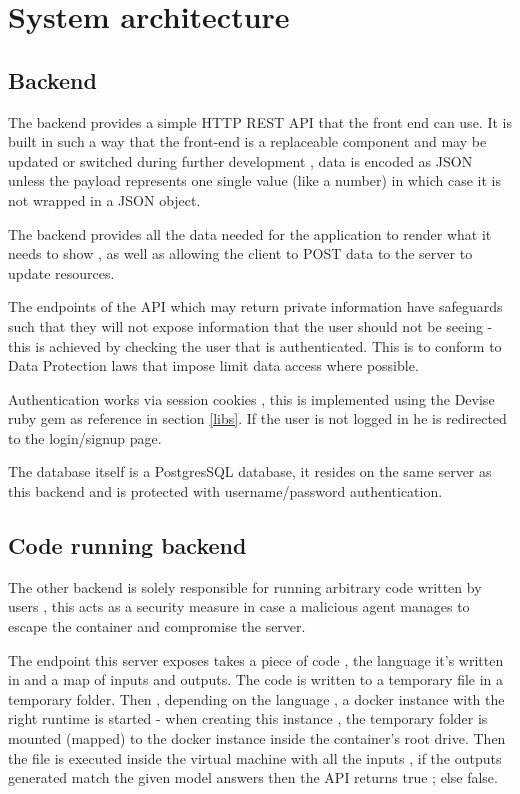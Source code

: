 \section{System architecture}
\subsection{Backend}
The backend provides a simple HTTP REST API that the front end can use. It is built in such a way that the front-end is a replaceable component and may be updated or switched during further development , data is encoded as JSON unless the payload represents one single value (like a number) in which case it is not wrapped in a JSON object.

The backend provides all the data needed for the application to render what it needs to show , as well as allowing the client to POST data to the server to update resources.

The endpoints of the API which may return private information have safeguards such that they will not expose information that the user should not be seeing - this is achieved by checking the user that is authenticated. This is to conform to Data Protection laws that impose limit data access where possible.

Authentication works via session cookies , this is implemented using the Devise ruby gem as reference in section \ref{libs}. If the user is not logged in he is redirected to the login/signup page.

The database itself is a PostgresSQL database, it resides on the same server as this backend and is protected with username/password authentication.

\subsection{Code running backend}
The other backend is solely responsible for running arbitrary code written by users , this acts as a security measure in case a malicious agent manages to escape the container and compromise the server.

The endpoint this server exposes takes a piece of code , the language it's written in and a map of inputs and outputs. The code is written to a temporary file in a temporary folder. Then , depending on the language , a docker instance with the right runtime is started - when creating this instance , the temporary folder is mounted (mapped) to the docker instance inside the container's root drive. Then the file is executed inside the virtual machine with all the inputs , if the outputs generated match the given model answers then the API returns true ; else false. 

